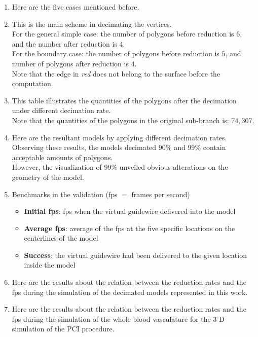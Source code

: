 \documentclass{article}
\begin{document}
\begin{enumerate}
\item Here are the five cases mentioned before.

\item This is the main scheme in decimating the vertices. \\
      For the general simple case: the number of polygons before reduction is $6$, and the number after reduction is $4$. \\
	  For the boundary case: the number of polygons before reduction is $5$, and number of polygons after reduction is $4$. \\
	  Note that the edge in \emph{red} does not belong to the surface before the computation.

\item This table illustrates the quantities of the polygons after the decimation under different decimation rate.\\
      Note that the quantities of the polygons in the original sub-branch is: $74,307$.

\item Here are the resultant models by applying different decimation rates.\\
      Observing these results, the models decimated $90\%$ and $99\%$ contain acceptable amounts of polygons.\\
      However, the visualization of $99\%$ unveiled obvious alterations on the geometry of the model.

\item Benchmarks in the validation (fps $=$ frames per second)
      \begin{itemize}
      \item \textbf{Initial fps}: fps when the virtual guidewire delivered into the model
      \item \textbf{Average fps}: average of the fps at the five specific locations on the centerlines of the model
      \item \textbf{Success}: the virtual guidewire had been delivered to the given location inside the model
      \end{itemize}

\item Here are the results about the relation between the reduction rates and the fps during the simulation of the decimated models represented in this work.

\item Here are the results about the relation between the reduction rates and the fps during the simulation of the whole blood vasculature for the 3-D simulation of the PCI procedure. 


\end{enumerate}
\end{document}
